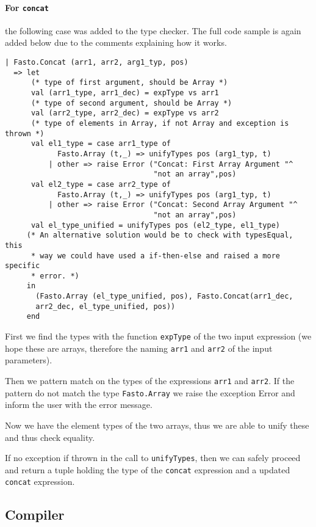 \documentclass[11pt,a4paper]{article}
\begin{document}
\paragraph{For \texttt{concat}} the following case was added to the type checker. The full
code sample is again added below due to the comments explaining how it
works.
\begin{Code}
\begin{lstlisting}
| Fasto.Concat (arr1, arr2, arg1_typ, pos)
  => let
      (* type of first argument, should be Array *)
      val (arr1_type, arr1_dec) = expType vs arr1
      (* type of second argument, should be Array *)
      val (arr2_type, arr2_dec) = expType vs arr2
      (* type of elements in Array, if not Array and exception is thrown *)
      val el1_type = case arr1_type of
            Fasto.Array (t,_) => unifyTypes pos (arg1_typ, t)
          | other => raise Error ("Concat: First Array Argument "^
                                  "not an array",pos)
      val el2_type = case arr2_type of
            Fasto.Array (t,_) => unifyTypes pos (arg1_typ, t)
          | other => raise Error ("Concat: Second Array Argument "^
                                  "not an array",pos)
      val el_type_unified = unifyTypes pos (el2_type, el1_type)
     (* An alternative solution would be to check with typesEqual, this
      * way we could have used a if-then-else and raised a more specific
      * error. *)
     in
       (Fasto.Array (el_type_unified, pos), Fasto.Concat(arr1_dec,
       arr2_dec, el_type_unified, pos))
     end
\end{lstlisting}
\end{Code}
First we find the types with the function \texttt{expType} of the two input
expression (we hope these are arrays, therefore the naming \texttt{arr1} and
\texttt{arr2} of the input parameters).

Then we pattern match on the types of the expressions \texttt{arr1} and
\texttt{arr2}. If the pattern do not match the type \texttt{Fasto.Array} we
raise the exception Error and inform the user with the error message.

Now we have the element types of the two arrays, thus we are able to unify
these and thus check equality.

If no exception if thrown in the call to \texttt{unifyTypes}, then we can
safely proceed and return a tuple holding the type of the \texttt{concat}
expression and a updated \texttt{concat} expression.

\subsection{Compiler}
\end{document}
